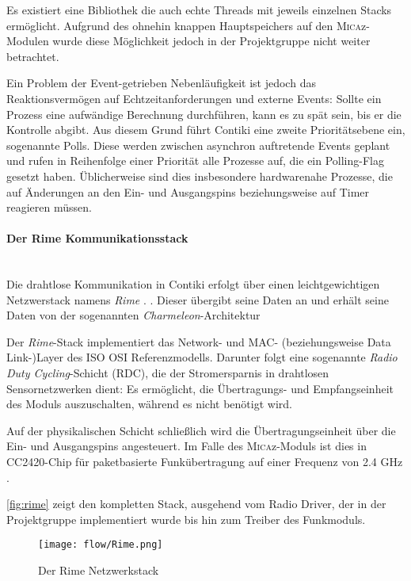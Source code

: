 Es existiert eine Bibliothek die auch echte Threads mit jeweils einzelnen Stacks ermöglicht. Aufgrund des ohnehin knappen Hauptspeichers auf den \textsc{Mica}z-Modulen wurde diese Möglichkeit jedoch in der Projektgruppe nicht weiter betrachtet.

Ein Problem der Event-getrieben Nebenläufigkeit ist jedoch das Reaktionsvermögen auf Echtzeitanforderungen und externe Events: Sollte ein Prozess eine aufwändige Berechnung durchführen, kann es zu spät sein, bis er die Kontrolle abgibt. Aus diesem Grund führt Contiki eine zweite Prioritätsebene ein, sogenannte Polls. Diese werden zwischen asynchron auftretende Events geplant und rufen in Reihenfolge einer Priorität alle Prozesse auf, die ein Polling-Flag gesetzt haben. Üblicherweise sind dies insbesondere hardwarenahe Prozesse, die auf Änderungen an den Ein- und Ausgangspins beziehungsweise auf Timer reagieren müssen.
\paragraph{Der Rime Kommunikationsstack}\mbox{}\\
Die drahtlose Kommunikation in Contiki erfolgt über einen leichtgewichtigen Netzwerstack namens \textit{Rime} \cite{Dunkels:2007:Proc}. . Dieser übergibt seine Daten an und erhält seine Daten von der sogenannten \textit{Charmeleon}-Architektur

Der \textit{Rime}-Stack implementiert das Network- und MAC- (beziehungsweise Data Link-)Layer des ISO OSI Referenzmodells. Darunter folgt eine sogenannte \textit{Radio Duty Cycling}-Schicht (RDC), die der Stromersparnis in drahtlosen Sensornetzwerken dient: Es ermöglicht, die Übertragungs- und Empfangseinheit des Moduls auszuschalten, während es nicht benötigt wird.

Auf der physikalischen Schicht schließlich wird die Übertragungseinheit über die Ein- und Ausgangspins angesteuert. Im Falle des \textsc{Mica}z-Moduls ist dies in CC2420-Chip für paketbasierte Funkübertragung auf einer Frequenz von 2.4 GHz \cite{CC2420:2014:Online}.

\autoref{fig:rime} zeigt den kompletten Stack, ausgehend vom Radio Driver, der in der Projektgruppe implementiert wurde bis hin zum Treiber des Funkmoduls.

\begin{figure}[h!]
 \centering
		\texttt{[image: flow/Rime.png]}
	\caption{Der Rime Netzwerkstack \cite{Dunkels:2007:Proc}}
	\label{fig:rime}
\end{figure}

